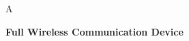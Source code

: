 \documentclass[12pt,brazil]{article}
\begin{document}






\begin{phantom}
A \vspace{6cm}
\end{phantom}

\begin{center}
    \Huge \textbf{Full Wireless Communication Device}\vspace{8cm}
\end{center} 

\begin{center}
      \vspace{4cm}
\end{center} 

\begin{center}
\end{center} 

\begin{center}
     \\ 
\end{center} 






   







\justifying
\newpage
\tableofcontents %

\clearpage %






\end{document}
